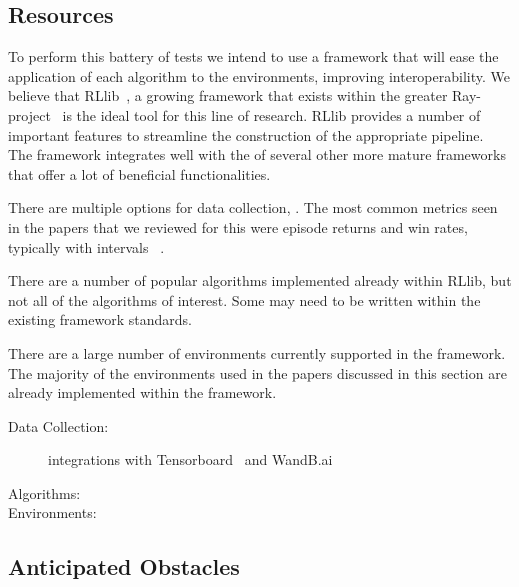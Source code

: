 \subsection{Resources}

To perform this battery of tests we intend to use a framework that will ease the application 
of each algorithm to the environments, improving interoperability. 
We believe that RLlib~\cite{liang2018}, a growing framework that exists within the greater
Ray-project~\cite{zotero-2599} is the ideal tool for this line of research.
RLlib provides a number of important features to streamline the construction of the appropriate
pipeline.
The framework integrates well with the  of several other more mature 
frameworks that offer a lot of beneficial functionalities.

There are multiple options for data collection, \cite{zotero-2601,zotero-2603}.
The most common metrics seen in the papers that we reviewed for this \printdoctype
were episode returns and win rates, typically with intervals~
\cite{zhong2024,yu2022,papoudakis2021,lowe2020,zheng2020}.

There are a number of popular algorithms implemented already within RLlib,
but not all of the algorithms of interest. Some may need to be written within
the existing framework standards.

There are a large number of environments currently supported in the framework.
The majority of the environments used in the papers discussed in this section are 
already implemented within the framework. 


\begin{description}
    \item[Data Collection:] integrations with Tensorboard~\cite{zotero-2601} 
    and WandB.ai~\cite{zotero-2603}
    \item[Algorithms:] 
    \item[Environments:] 
\end{description}









\subsection{Anticipated Obstacles}




